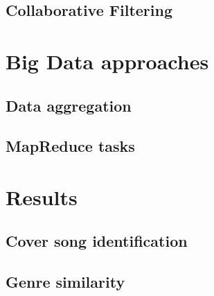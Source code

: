 \section{Collaborative Filtering}


\chapter{Big Data approaches}

\section{Data aggregation}

\section{MapReduce tasks}


\chapter{Results}

\section{Cover song identification}

\section{Genre similarity}



